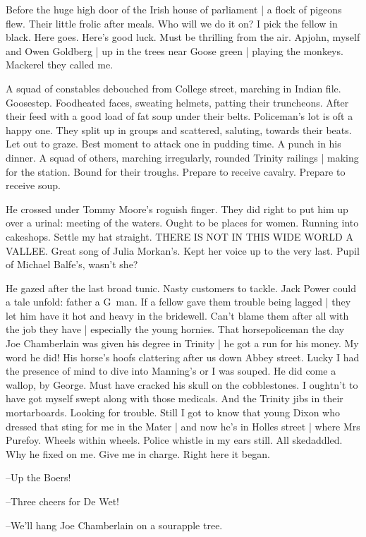 Before the huge high door of the Irish house of parliament |
a flock of pigeons flew.
Their little frolic after meals.
Who will we do it on?
I pick the fellow in black.
Here goes.
Here's good luck.
Must be thrilling from the air.
Apjohn, myself and Owen Goldberg |
up in the trees near Goose green |
playing the monkeys.
Mackerel they called me.

A squad of constables debouched from College street,
marching in Indian file.
Goosestep.
Foodheated faces,
sweating helmets,
patting their truncheons.
After their feed with a good load of fat soup under their belts.
Policeman's lot is oft a happy one.
They split up in groups and scattered,
saluting,
towards their beats.
Let out to graze.
Best moment to attack one in pudding time.
A punch in his dinner.
A squad of others,
marching irregularly,
rounded Trinity railings |
making for the station.
Bound for their troughs.
Prepare to receive cavalry.
Prepare to receive soup.

He crossed under Tommy Moore's roguish finger.
They did right to put him up over a urinal:
meeting of the waters.
Ought to be places for women.
Running into cakeshops.
Settle my hat straight.
THERE IS NOT IN THIS WIDE WORLD A VALLEE.
Great song of Julia Morkan's.
Kept her voice up to the very last.
Pupil of Michael Balfe's,
wasn't she?

He gazed after the last broad tunic.
Nasty customers to tackle.
Jack Power could a tale unfold:
father a G~man.
If a fellow gave them trouble being lagged |
they let him have it hot and heavy in the bridewell.
Can't blame them after all with the job they have |
especially the young hornies.
That horsepoliceman the day Joe Chamberlain was given his degree in Trinity |
he got a run for his money.
My word he did!
His horse's hoofs clattering after us down Abbey street.
Lucky I had the presence of mind to dive into Manning's or I was souped.
He did come a wallop,
by George.
Must have cracked his skull on the cobblestones.
I oughtn't to have got myself swept along with those medicals.
And the Trinity jibs in their mortarboards.
Looking for trouble.
Still I got to know that young Dixon
who dressed that sting for me in the Mater |
and now he's in Holles street |
where Mrs Purefoy.
Wheels within wheels.
Police whistle in my ears still.
All skedaddled.
Why he fixed on me.
Give me in charge.
Right here it began.

--Up the Boers!

--Three cheers for De Wet!

--We'll hang Joe Chamberlain on a sourapple tree.

